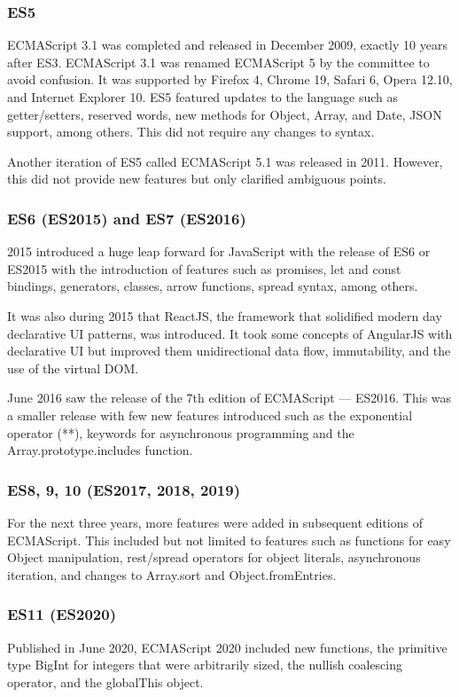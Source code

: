 \documentclass{article}
\begin{document}
    \subsubsection{ES5}
    ECMAScript 3.1 was completed and released in December 2009, exactly 10 years
    after ES3. ECMAScript 3.1 was renamed ECMAScript 5 by the committee to avoid
    confusion. It was supported by Firefox 4, Chrome 19, Safari 6, Opera 12.10,
    and Internet Explorer 10. ES5 featured updates to the language such as
    getter/setters, reserved words, new methods for Object, Array, and Date,
    JSON support, among others. This did not require any changes to syntax.

    Another iteration of ES5 called ECMAScript 5.1 was released in 2011.
    However, this did not provide new features but only clarified ambiguous
    points.

    \subsubsection{ES6 (ES2015) and ES7 (ES2016)}
    2015 introduced a huge leap forward for JavaScript with the release of ES6
    or ES2015 with the introduction of features such as promises, let and const
    bindings, generators, classes, arrow functions, spread syntax, among others.

    It was also during 2015 that ReactJS, the framework that solidified modern
    day declarative UI patterns, was introduced. It took some concepts of
    AngularJS with declarative UI but improved them unidirectional data flow,
    immutability, and the use of the virtual DOM.\@

    June 2016 saw the release of the 7th edition of ECMAScript --- ES2016. This
    was a smaller release with few new features introduced such as the
    exponential operator (**), keywords for asynchronous programming and the
    Array.prototype.includes function.

    \subsubsection{ES8, 9, 10 (ES2017, 2018, 2019)}
    For the next three years, more features were added in subsequent editions of
    ECMAScript. This included but not limited to features such as functions for
    easy Object manipulation, rest/spread operators for object literals,
    asynchronous iteration, and changes to Array.sort and Object.fromEntries.

    \subsubsection{ES11 (ES2020)}
    Published in June 2020, ECMAScript 2020 included new functions, the
    primitive type BigInt for integers that were arbitrarily sized, the nullish
    coalescing operator, and the globalThis object.
\end{document}
